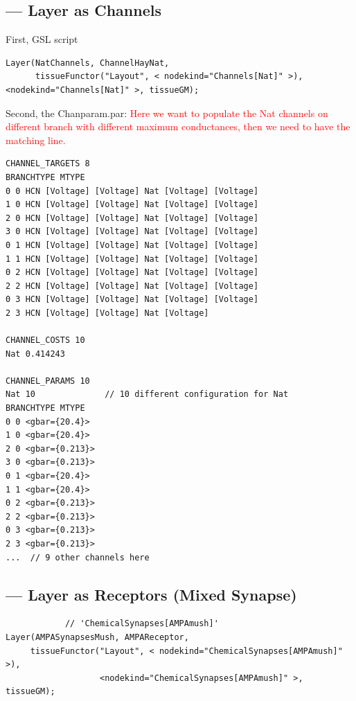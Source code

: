 \subsection{--- Layer as Channels}
\label{sec:Layer-as-Channel}

First, GSL script
{\tiny
\begin{verbatim}
Layer(NatChannels, ChannelHayNat, 
      tissueFunctor("Layout", < nodekind="Channels[Nat]" >), <nodekind="Channels[Nat]" >, tissueGM);
\end{verbatim}
}

Second, the Chanparam.par: \textcolor{red}{Here we want to populate the Nat
channels on different branch with different maximum conductances, then we need
to have the matching line.}

\begin{verbatim}
CHANNEL_TARGETS 8
BRANCHTYPE MTYPE
0 0 HCN [Voltage] [Voltage] Nat [Voltage] [Voltage] 
1 0 HCN [Voltage] [Voltage] Nat [Voltage] [Voltage] 
2 0 HCN [Voltage] [Voltage] Nat [Voltage] [Voltage] 
3 0 HCN [Voltage] [Voltage] Nat [Voltage] [Voltage] 
0 1 HCN [Voltage] [Voltage] Nat [Voltage] [Voltage] 
1 1 HCN [Voltage] [Voltage] Nat [Voltage] [Voltage] 
0 2 HCN [Voltage] [Voltage] Nat [Voltage] [Voltage] 
2 2 HCN [Voltage] [Voltage] Nat [Voltage] [Voltage] 
0 3 HCN [Voltage] [Voltage] Nat [Voltage] [Voltage] 
2 3 HCN [Voltage] [Voltage] Nat [Voltage] 

CHANNEL_COSTS 10
Nat 0.414243

CHANNEL_PARAMS 10
Nat 10              // 10 different configuration for Nat
BRANCHTYPE MTYPE
0 0 <gbar={20.4}>
1 0 <gbar={20.4}>
2 0 <gbar={0.213}>
3 0 <gbar={0.213}>
0 1 <gbar={20.4}>
1 1 <gbar={20.4}>
0 2 <gbar={0.213}>
2 2 <gbar={0.213}>
0 3 <gbar={0.213}>
2 3 <gbar={0.213}>
...  // 9 other channels here
\end{verbatim}

\subsection{--- Layer as Receptors (Mixed Synapse)}
\label{sec:Layer-as-Receptors}

\begin{verbatim}
            // 'ChemicalSynapses[AMPAmush]'
Layer(AMPASynapsesMush, AMPAReceptor, 
     tissueFunctor("Layout", < nodekind="ChemicalSynapses[AMPAmush]" >), 
                   <nodekind="ChemicalSynapses[AMPAmush]" >, tissueGM);

\end{verbatim}


